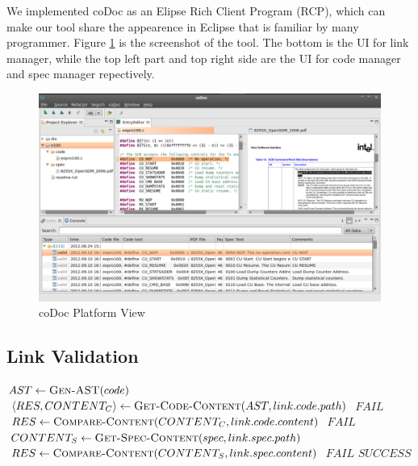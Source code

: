 We implemented coDoc as an Elipse Rich Client Program (RCP), 
which can make our tool share the appearence in Eclipse that is familiar by many programmer.
Figure \ref{fig:platformview} is the screenshot of the tool.
The bottom is the UI for link manager, while the top left part and top right side are the UI for code manager and spec manager repectively.

\begin{figure}
\begin{center}
\includegraphics[width=\textwidth]{platformview}
\caption{coDoc Platform View}
\label{fig:platformview}
\end{center}
\end{figure}


\subsection{Link Validation}

\begin{algorithm}[!h]
\DontPrintSemicolon
{}
$AST \leftarrow \textsc{Gen-AST}(code)$\;
$\langle RES, CONTENT_C \rangle \leftarrow \textsc{Get-Code-Content}(AST, link.code.path)$\;
 {
\Return $FAIL$\;
}
$RES \leftarrow \textsc{Compare-Content}(CONTENT_C, link.code.content)$\;
 {
\Return $FAIL$\;
}
$CONTENT_S \leftarrow \textsc{Get-Spec-Content}(spec, link.spec.path)$\;
$RES \leftarrow \textsc{Compare-Content}(CONTENT_S, link.spec.content)$\;
 {
\Return $FAIL$\;
}
\Return $SUCCESS$\;
\caption{$\textsc{Traceability-Link-Validation}(link)$}
\label{alg:validate}
\end{algorithm}

